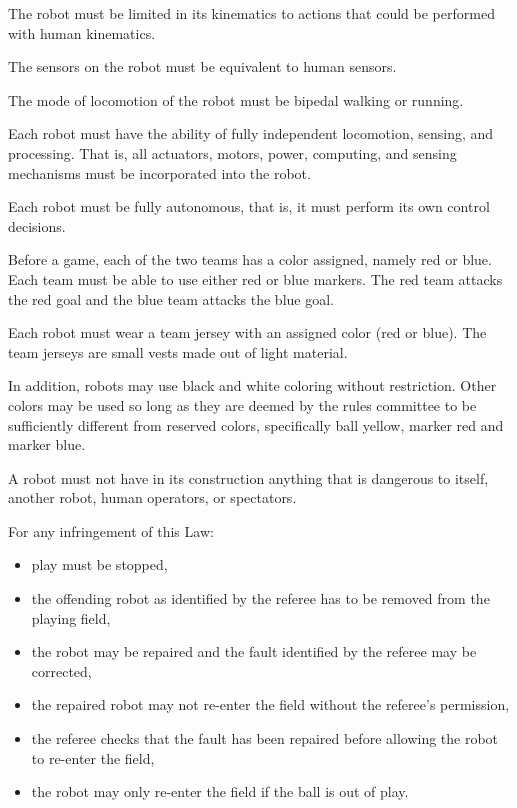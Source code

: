 \documentclass[12pt]{hurocup}
\begin{document}
\begin{lawlist}[G]
\item \label{kinematics} The robot must be limited in its kinematics
to actions that could be performed with human kinematics.

\item \label{sensing} The sensors on the robot must be equivalent to
human sensors.

\item \label{walking} The mode of locomotion of the robot must be
bipedal walking or running. 

\item \label{autonomous} Each robot must have the ability of fully
  independent locomotion, sensing, and processing. That is, all
  actuators, motors, power, computing, and sensing mechanisms must be
  incorporated into the robot.

\item \label{autonomous2} Each robot must be fully autonomous, that
  is, it must perform its own control decisions.

\item Before a game, each of the two teams has a color assigned,
  namely red or blue. Each team must be able to use either red
  or blue markers. The red team attacks the red goal and the
  blue team attacks the blue goal. 

\item Each robot must wear a team jersey with an assigned color
(red or blue). The team jerseys are small vests made out of light
material.

\item In addition, robots may use black and white coloring without
  restriction. Other colors may be used so long as they are deemed by
  the rules committee to be sufficiently different from reserved
  colors, specifically ball yellow, marker red and
  marker blue.

\item A robot must not have in its construction anything that is
  dangerous to itself, another robot, human operators, or spectators.

\item For any infringement of this Law:
  \begin{itemize}
  \item play must be stopped,
  \item the offending robot as identified by the referee has to be
    removed from the playing field,
  \item the robot may be repaired and the fault identified by the
    referee may be corrected,
  \item the repaired robot may not re-enter the field without the
    referee's permission,
  \item the referee checks that the fault has been repaired before
    allowing the robot to re-enter the field,
  \item the robot may only re-enter the field if the ball is out of
    play. 
  \end{itemize}
\end{lawlist}
\end{document}
